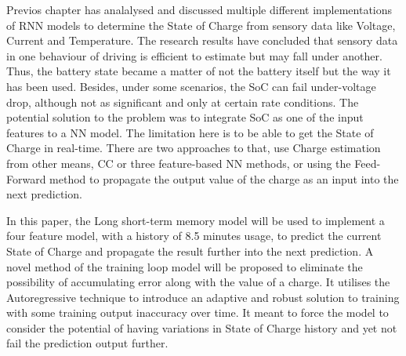 
%
%
Previos chapter has analalysed and discussed multiple different implementations of RNN models to determine the State of Charge from sensory data like Voltage, Current and Temperature.
The research results have concluded that sensory data in one behaviour of driving is efficient to estimate but may fall under another.
Thus, the battery state became a matter of not the battery itself but the way it has been used.
Besides, under some scenarios, the SoC can fail under-voltage drop, although not as significant and only at certain rate conditions.
The potential solution to the problem was to integrate SoC as one of the input features to a NN model.
The limitation here is to be able to get the State of Charge in real-time.
There are two approaches to that, use Charge estimation from other means, CC or three feature-based NN methods, or using the Feed-Forward method to propagate the output value of the charge as an input into the next prediction.

%
%
In this paper, the Long short-term memory model will be used to implement a four feature model, with a history of 8.5 minutes usage, to predict the current State of Charge and propagate the result further into the next prediction.
A novel method of the training loop model will be proposed to eliminate the possibility of accumulating error along with the value of a charge.
It utilises the Autoregressive technique to introduce an adaptive and robust solution to training with some training output inaccuracy over time.
It meant to force the model to consider the potential of having variations in State of Charge history and yet not fail the prediction output further.

